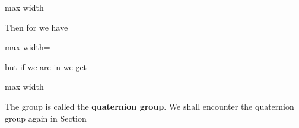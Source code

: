 \documentclass[11pt,oneside]{article}
\begin{document}
\BookNarrativetrue

\begin{BookBody}

\begin{center}\begin{adjustbox}{max width=\linewidth}\end{adjustbox}\end{center}

\noindent Then for  we have

\begin{center}\begin{adjustbox}{max width=\linewidth}\end{adjustbox}\end{center}

\noindent but if we are in  we get

\begin{center}\begin{adjustbox}{max width=\linewidth}\end{adjustbox}\end{center}

The group  is called the\textbf{ quaternion group}. We shall encounter the quaternion group again in Section \BookEnd{\blacktriangle}

\end{BookBody}

\BookNarrativefalse
\end{document}
